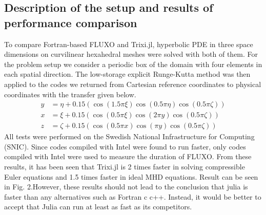 \documentclass{article}
\begin{document}
\subsection{ Description of the setup and results of performance comparison}
To compare Fortran-based FLUXO and Trixi.jl, hyperbolic PDE in three space dimensions on curvilinear hexahedral meshes were solved with both of them. For the problem setup we consider a periodic box of the domain with four elements in each spatial direction. The low-storage explicit Runge-Kutta method was then applied to the codes we returned from Cartesian reference coordinates to physical coordinates with the transfer given below.
\begin{align}
    y &= \eta + 0.15(\cos(1.5\pi\xi)\cos(0.5\pi\eta)\cos(0.5\pi\zeta)) \\
    x &= \xi + 0.15(\cos(0.5\pi\xi)\cos(2\pi y)\cos(0.5\pi\zeta)) \\
    z &= \zeta + 0.15(\cos(0.5\pi x)\cos(\pi y)\cos(0.5\pi\zeta))
\end{align}
All tests were performed on the Swedish National Infrastructure for Computing (SNIC). Since codes compiled with Intel were found to run faster, only codes compiled with Intel were used to measure the duration of FLUXO. From these results, it has been seen that Trixi.jl is 2 times faster in solving compressible Euler equations and 1.5 times faster in ideal MHD equations. Result can be seen in Fig. 2.However, these results should not lead to the conclusion that julia is faster than any alternatives such as Fortran c c++. Instead, it would be better to accept that Julia can run at least as fast as its competitors.
\end{document}
